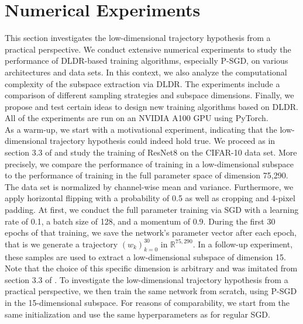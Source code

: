 \documentclass[11pt, a4paper]{article}
\newcommand{\R}{\mathbb{R}}
\begin{document}
\pagebreak
\section{Numerical Experiments} \label{sec:Experiments}

This section investigates the low-dimensional trajectory hypothesis from a practical perspective. We conduct extensive numerical experiments to study the performance of DLDR-based training algorithms, especially P-SGD, on various architectures and data sets. In this context, we also analyze the computational complexity of the subspace extraction via DLDR. The experiments include a comparison of different sampling strategies and subspace dimensions. Finally, we propose and test certain ideas to design new training algorithms based on DLDR. All of the experiments are run on an NVIDIA A100 GPU using PyTorch. \\

As a warm-up, we start with a motivational experiment, indicating that the low-dimensional trajectory hypothesis could indeed hold true. We proceed as in section 3.3 of \cite{Paper} and study the training of ResNet8 \cite{ResNet} on the CIFAR-10 data set. More precisely, we compare the performance of training in a low-dimensional subspace to the performance of training in the full parameter space of dimension 75,290. The data set is normalized by channel-wise mean and variance. Furthermore, we apply horizontal flipping with a probability of 0.5 as well as cropping and 4-pixel padding. At first, we conduct the full parameter training via SGD with a learning rate of 0.1, a batch size of 128, and a momentum of 0.9. During the first 30 epochs of that training, we save the network's parameter vector after each epoch, that is we generate a trajectory $(w_k)_{k=0}^{30}$ in $\R^{75,290}$. In a follow-up experiment, these samples are used to extract a low-dimensional subspace of dimension 15. Note that the choice of this specific dimension is arbitrary and was imitated from section 3.3 of \cite{Paper}. To investigate the low-dimensional trajectory hypothesis from a practical perspective, we then train the same network from scratch, using P-SGD in the 15-dimensional subspace. For reasons of comparability, we start from the same initialization and use the same hyperparameters as for regular SGD.
\end{document}
